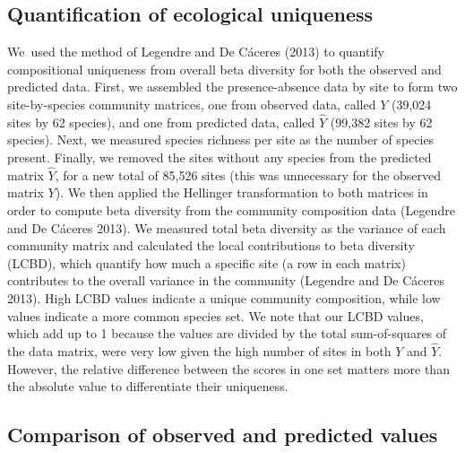 \documentclass[10pt,oneside]{article}
\begin{document}
\hypertarget{quantification-of-ecological-uniqueness}{%
\subsection{Quantification of ecological
uniqueness}\label{quantification-of-ecological-uniqueness}}

We~used the method of Legendre and De Cáceres (2013) to quantify
compositional uniqueness from overall beta diversity for both the
observed and predicted data. First, we assembled the presence-absence
data by site to form two site-by-species community matrices, one from
observed data, called \(Y\) (39,024 sites by 62 species), and one from
predicted data, called \(\hat Y\) (99,382 sites by 62 species). Next, we
measured species richness per site as the number of species present.
Finally, we removed the sites without any species from the predicted
matrix \(\hat Y\), for a new total of 85,526 sites (this was unnecessary
for the observed matrix \(Y\)). We then applied the Hellinger
transformation to both matrices in order to compute beta diversity from
the community composition data (Legendre and De Cáceres 2013). We
measured total beta diversity as the variance of each community matrix
and calculated the local contributions to beta diversity (LCBD), which
quantify how much a specific site (a row in each matrix) contributes to
the overall variance in the community (Legendre and De Cáceres 2013).
High LCBD values indicate a unique community composition, while low
values indicate a more common species set. We note that our LCBD values,
which add up to 1 because the values are divided by the total
sum-of-squares of the data matrix, were very low given the high number
of sites in both \(Y\) and \(\hat Y\). However, the relative difference
between the scores in one set matters more than the absolute value to
differentiate their uniqueness.

\hypertarget{comparison-of-observed-and-predicted-values}{%
\subsection{Comparison of observed and predicted
values}\label{comparison-of-observed-and-predicted-values}}
\end{document}
